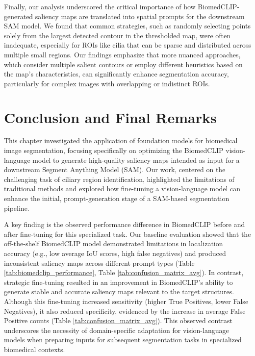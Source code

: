 \documentclass[./dissertation.tex]{subfiles}
\begin{document}
Finally, our analysis underscored the critical importance of how BiomedCLIP-generated saliency maps are translated into spatial prompts for the downstream SAM model. We found that common strategies, such as randomly selecting points solely from the largest detected contour in the thresholded map, were often inadequate, especially for ROIs like cilia that can be sparse and distributed across multiple small regions. Our findings emphasize that more nuanced approaches, which consider multiple salient contours or employ different heuristics based on the map's characteristics, can significantly enhance segmentation accuracy, particularly for complex images with overlapping or indistinct ROIs.

\section{Conclusion and Final Remarks}

This chapter investigated the application of foundation models for biomedical image segmentation, focusing specifically on optimizing the BiomedCLIP vision-language model to generate high-quality saliency maps intended as input for a downstream Segment Anything Model (SAM). Our work, centered on the challenging task of ciliary region identification, highlighted the limitations of traditional methods and explored how fine-tuning a vision-language model can enhance the initial, prompt-generation stage of a SAM-based segmentation pipeline.

A key finding is the observed performance difference in BiomedCLIP before and after fine-tuning for this specialized task. Our baseline evaluation showed that the off-the-shelf BiomedCLIP model demonstrated limitations in localization accuracy (e.g., low average IoU scores, high false negatives) and produced inconsistent saliency maps across different prompt types (Table \ref{tab:biomedclip_performance}, Table \ref{tab:confusion_matrix_avg}). In contrast, strategic fine-tuning resulted in an improvement in BiomedCLIP's ability to generate stable and accurate saliency maps relevant to the target structures. Although this fine-tuning increased sensitivity (higher True Positives, lower False Negatives), it also reduced specificity, evidenced by the increase in average False Positive counts (Table \ref{tab:confusion_matrix_avg}). This observed contrast underscores the necessity of domain-specific adaptation for vision-language models when preparing inputs for subsequent segmentation tasks in specialized biomedical contexts.
\end{document}
